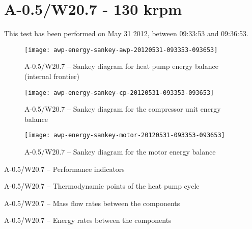 
\section{A-0.5/W20.7 - 130 krpm}
\label{sec:awp-exp-details-A-0.5/W20.7}

This test has been performed on May 31\th{} 2012, between 09:33:53 and
09:36:53.

\begin{figure}[htbp]
  \centering
  \texttt{[image: awp-energy-sankey-awp-20120531-093353-093653]}
  \caption{A-0.5/W20.7 -- Sankey diagram for heat pump energy balance (internal frontier)}
  \label{fig:awp-A-0.5/W20.7-sankey-energy}
\end{figure}


\begin{figure}[htbp]
  \centering
  \texttt{[image: awp-energy-sankey-cp-20120531-093353-093653]}
  \caption{A-0.5/W20.7 -- Sankey diagram for the compressor unit energy balance}
  \label{fig:awp-A-0.5/W20.7-sankey-cp}
\end{figure}

\begin{figure}[htbp]
  \centering
  \texttt{[image: awp-energy-sankey-motor-20120531-093353-093653]}
  \caption{A-0.5/W20.7 -- Sankey diagram for the motor energy balance}
  \label{fig:awp-A-0.5/W20.7-sankey-motor}
\end{figure}

\begin{table}[htbp]
    \footnotesize
    \begin{center}
    
  \end{center}
  \caption{A-0.5/W20.7 -- Performance indicators}
\end{table}

\begin{table}[htbp]
  \footnotesize
  \begin{center}
    
  \end{center}
  \caption{A-0.5/W20.7 -- Thermodynamic points of the heat pump cycle}
  \label{tab:A-0.5/W20.7-PThs}
\end{table}


\begin{table}[htbp]
    \footnotesize
    \begin{center}
    
  \end{center}
  \caption{A-0.5/W20.7 -- Mass flow rates between the components}
  \label{tab:awp-A-0.5/W20.7-mf}
\end{table}

\begin{table}[htbp]
    \footnotesize
    \begin{center}
    
  \end{center}
  \caption{A-0.5/W20.7 -- Energy rates between the components}
  \label{tab:A-0.5/W20.7-energy-flows}
\end{table}

\FloatBarrier
